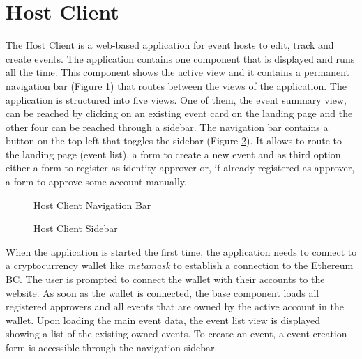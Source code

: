 \section{Host Client}

The Host Client is a web-based application for event hosts to edit, track and create events. The application contains one component that is displayed and runs all the time. This component shows the active view and it contains a permanent navigation bar (Figure \ref{img:host-client-navbar}) that routes between the views of the application. The application is structured into five views. One of them, the event summary view, can be reached by clicking on an existing event card on the landing page and the other four can be reached through a sidebar. The navigation bar contains a button on the top left that toggles the sidebar (Figure \ref{img:host-client-sidebar}). It allows to route to the landing page (event list), a form to create a new event and as third option either a form to register as identity approver or, if already registered as approver, a form to approve some account manually.

\begin{figure}[H]
    \centering
    \caption{Host Client Navigation Bar \protect}
    \label{img:host-client-navbar}
\end{figure}

\begin{figure}[H]
    \centering
    \caption{Host Client Sidebar \protect}
    \label{img:host-client-sidebar}
\end{figure}

When the application is started the first time, the application needs to connect to a cryptocurrency wallet like \textit{metamask} to establish a connection to the Ethereum BC. The user is prompted to connect the wallet with their accounts to the website. As soon as the wallet is connected, the base component loads all registered approvers and all events that are owned by the active account in the wallet. Upon loading the main event data, the event list view is displayed showing a list of the existing owned events. To create an event, a event creation form is accessible through the navigation sidebar.

